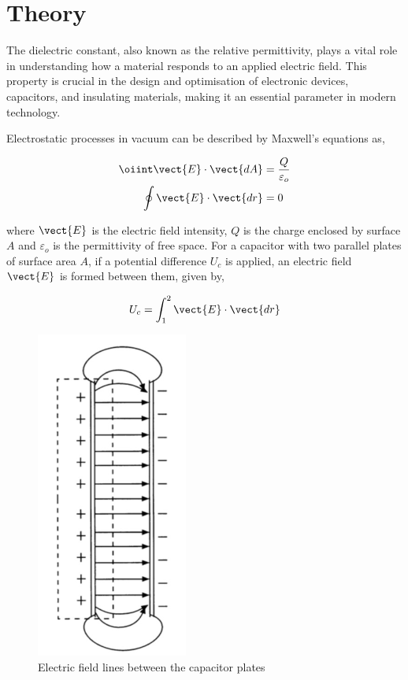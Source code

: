 \section{Theory}

The dielectric constant, also known as the relative permittivity, plays a vital role in understanding how a material responds to an applied electric field. This property is crucial in the design and optimisation of electronic devices, capacitors, and insulating materials, making it an essential parameter in modern technology.

Electrostatic processes in vacuum can be described by Maxwell’s equations as,

\begin{align}
    \oiint \vect{E} \cdot \vect{dA} &= \frac{Q}{\varepsilon_o}\\
    \oint \vect{E} \cdot \vect{dr} &= 0
\end{align}

where $\vect{E}$ is the electric field intensity, $Q$ is the charge enclosed by surface $A$ and $\varepsilon_o$ is the permittivity of free space. For a capacitor with two parallel plates of surface area $A$, if a potential difference $U_c$ is applied, an electric field $\vect{E}$ is formed between them, given by,

\begin{align}
    U_c = \int_1^2 \vect{E} \cdot \vect{dr}
\end{align}

\begin{figure}[H]
    \centering
    \includegraphics[height=0.8\columnwidth]{images/f1.png}
    \caption{Electric field lines between the capacitor plates}
    \label{fig:1}
\end{figure}

